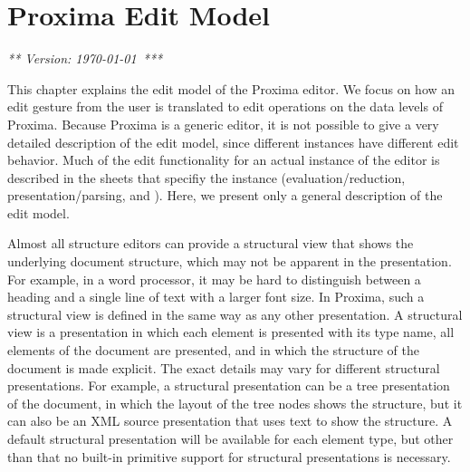 \chapter{Proxima Edit Model}
\label{chap:editModel}

{\em *** Version: \today~***}



%
%









This chapter explains the edit model of the Proxima editor. We focus on how an edit gesture from the user is translated to edit operations on the data levels of Proxima. Because Proxima is a generic editor, it is not possible to give a very detailed description of the edit model, since different instances have different edit behavior. Much of the edit functionality for an actual instance of the editor is described in the sheets that specifiy the instance (evaluation/reduction, presentation/parsing, and ). Here, we present only a general description of the edit model.


Almost all structure editors can provide a structural view that shows the underlying document structure, which may not be apparent in the presentation. For example, in a word processor, it may be hard to distinguish between a heading and a single line of text with a larger font size. In Proxima, such a structural view is defined in the same way as any other presentation. A structural view is a presentation in which each element is presented with its type name, all elements of the document are presented, and in which the structure of the document is made explicit. The exact details may vary for different structural presentations. For example, a structural presentation can be a tree presentation of the document, in which the layout of the tree nodes shows the structure, but it can also be an XML source presentation that uses text to show the structure. A default structural presentation will be available for each element type, but other than that no built-in primitive support for structural presentations is necessary.

